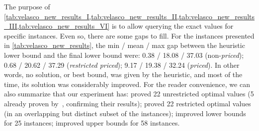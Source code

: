 \documentclass[ppgc,tese,english,formais,babel]{iiufrgs}
\begin{document}
The purpose of \cref{tab:velasco_new_results_I,tab:velasco_new_results_II,tab:velasco_new_results_III,tab:velasco_new_results_VI} is to allow querying the exact values for specific instances.
Even so, there are some gaps to fill.
For the instances presented in \cref{tab:velasco_new_results},
the min / mean / max gap between the heuristic lower bound and the final lower bound were: 0.38 / 18.08 / 37.03 (non-\emph{priced}); 0.68 / 20.62 / 37.29 (\emph{restricted priced}); 9.17 / 19.38 / 32.24 (\emph{priced}).
In other words, no solution, or best bound, was given by the heuristic, and most of the time, its solution was considerably improved.
For the reader convenience, we can also summarize that our experiment has:
proved 22 unrestricted optimal values (5 already proven by~\citet{velasco:2019}, confirming their results);
proved 22 restricted optimal values (in an overlapping but distinct subset of the instances);
improved lower bounds for 25 instances;
improved upper bounds for 58 instances.
\end{document}
